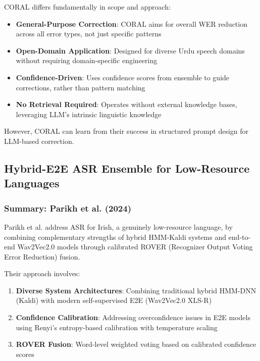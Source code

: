 CORAL differs fundamentally in scope and approach:

\begin{itemize}
    \item \textbf{General-Purpose Correction}: CORAL aims for overall WER reduction across all error types, not just specific patterns
    \item \textbf{Open-Domain Application}: Designed for diverse Urdu speech domains without requiring domain-specific engineering
    \item \textbf{Confidence-Driven}: Uses confidence scores from ensemble to guide corrections, rather than pattern matching
    \item \textbf{No Retrieval Required}: Operates without external knowledge bases, leveraging LLM's intrinsic linguistic knowledge
\end{itemize}

However, CORAL can learn from their success in structured prompt design for LLM-based correction.

\subsection{Hybrid-E2E ASR Ensemble for Low-Resource Languages}

\subsubsection{Summary: Parikh et al. (2024)}

Parikh et al. \cite{parikh2024} address ASR for Irish, a genuinely low-resource language, by combining complementary strengths of hybrid HMM-Kaldi systems and end-to-end Wav2Vec2.0 models through calibrated ROVER (Recognizer Output Voting Error Reduction) fusion.

Their approach involves:

\begin{enumerate}
    \item \textbf{Diverse System Architectures}: Combining traditional hybrid HMM-DNN (Kaldi) with modern self-supervised E2E (Wav2Vec2.0 XLS-R)
    \item \textbf{Confidence Calibration}: Addressing overconfidence issues in E2E models using Renyi's entropy-based calibration with temperature scaling
    \item \textbf{ROVER Fusion}: Word-level weighted voting based on calibrated confidence scores
\end{enumerate}

